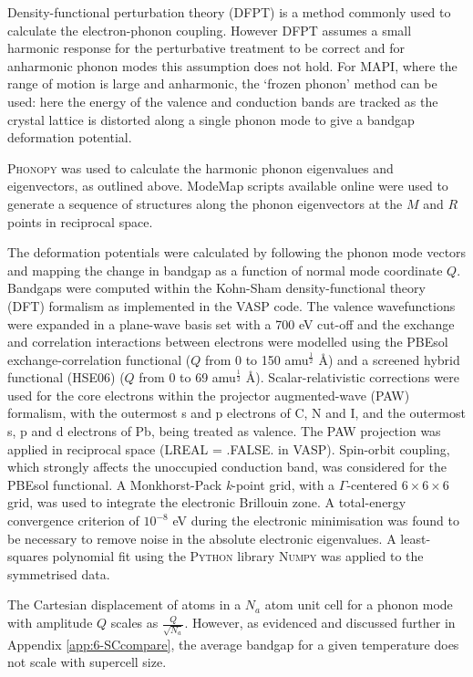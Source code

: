 Density-functional perturbation theory (DFPT) is a method commonly used to calculate the electron-phonon coupling. However DFPT assumes a small harmonic response for the perturbative treatment to be correct and for anharmonic phonon modes this assumption does not hold.
For MAPI, where the range of motion is large and anharmonic, the `frozen phonon' method can be used: here the energy of the valence and conduction bands are tracked as the crystal lattice is distorted along a single phonon mode to give a bandgap deformation potential.

\textsc{Phonopy}\autocite{Togo2015} was used to calculate the harmonic phonon eigenvalues and eigenvectors, as outlined above. ModeMap scripts available online\autocite{ModeMap} were used to generate a sequence of structures along the phonon eigenvectors at the $M$ and $R$ points in reciprocal space. 

The deformation potentials were calculated by following the phonon mode vectors and mapping the change in bandgap as a function of normal mode coordinate $Q$.
Bandgaps were computed within the Kohn-Sham density-functional theory (DFT) formalism as implemented in the \textsc{VASP} code.\autocite{Kresse1996a}
The valence wavefunctions were expanded in a plane-wave basis set with a 700 eV cut-off and the exchange and correlation interactions between electrons were modelled using the PBEsol exchange-correlation functional\autocite{Perdew2008a} ($Q$ from 0 to 150 amu$^{\frac{1}{2}}$ \AA) and a screened hybrid functional (HSE06)\autocite{Heyd2004a,Heyd2005a} ($Q$ from 0 to 69 amu$^{\frac{1}{2}}$ \AA).
Scalar-relativistic corrections were used for the core electrons within the projector augmented-wave (PAW) formalism,\autocite{Blochl1994} with the outermost s and p electrons of C, N and I, and the outermost s, p and d electrons of Pb, being treated as valence. 
The PAW projection was applied in reciprocal space (\textsc{LREAL = .FALSE.} in \textsc{VASP}).
Spin-orbit coupling, which strongly affects the unoccupied conduction band, was considered for the PBEsol functional.
A Monkhorst-Pack \textit{k}-point grid, with a $\Gamma$-centered $6 \times 6 \times 6$ grid, was used to integrate the electronic Brillouin zone.
A total-energy convergence criterion of $10^{-8}$ eV during the electronic minimisation was found to be necessary to remove noise in the absolute electronic eigenvalues.
A least-squares polynomial fit using the \textsc{Python} library \textsc{Numpy} was applied to the symmetrised data.

The Cartesian displacement of atoms in a $N_a$ atom unit cell for a phonon mode with amplitude $Q$ scales as $\frac{Q}{\sqrt{N_a}}$. %
However, as evidenced and discussed further in Appendix \ref{app:6-SCcompare}, the average bandgap for a given temperature does not scale with supercell size.

